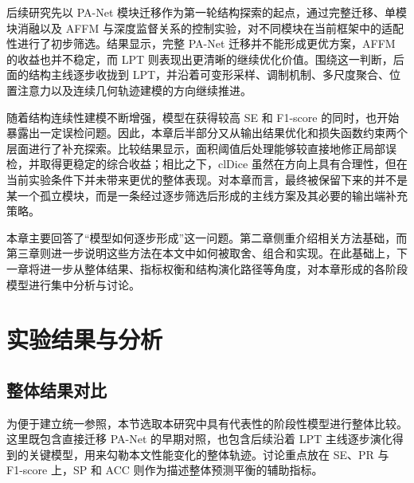\documentclass[a4paper,12pt]{article}
\begin{document}
后续研究先以 PA-Net 模块迁移作为第一轮结构探索的起点，通过完整迁移、单模块消融以及 AFFM 与深度监督关系的控制实验，对不同模块在当前框架中的适配性进行了初步筛选。结果显示，完整 PA-Net 迁移并不能形成更优方案，AFFM 的收益也并不稳定，而 LPT 则表现出更清晰的继续优化价值。围绕这一判断，后面的结构主线逐步收拢到 LPT，并沿着可变形采样、调制机制、多尺度聚合、位置注意力以及连续几何轨迹建模的方向继续推进。

随着结构连续性建模不断增强，模型在获得较高 SE 和 F1-score 的同时，也开始暴露出一定误检问题。因此，本章后半部分又从输出结果优化和损失函数约束两个层面进行了补充探索。比较结果显示，面积阈值后处理能够较直接地修正局部误检，并取得更稳定的综合收益；相比之下，clDice 虽然在方向上具有合理性，但在当前实验条件下并未带来更优的整体表现。对本章而言，最终被保留下来的并不是某一个孤立模块，而是一条经过逐步筛选后形成的主线方案及其必要的输出端补充策略。

本章主要回答了“模型如何逐步形成”这一问题。第二章侧重介绍相关方法基础，而第三章则进一步说明这些方法在本文中如何被取舍、组合和实现。在此基础上，下一章将进一步从整体结果、指标权衡和结构演化路径等角度，对本章形成的各阶段模型进行集中分析与讨论。

\section{实验结果与分析}

\subsection{整体结果对比}
为便于建立统一参照，本节选取本研究中具有代表性的阶段性模型进行整体比较。这里既包含直接迁移 PA-Net 的早期对照，也包含后续沿着 LPT 主线逐步演化得到的关键模型，用来勾勒本文性能变化的整体轨迹。讨论重点放在 SE、PR 与 F1-score 上，SP 和 ACC 则作为描述整体预测平衡的辅助指标。

\begin{table}[htbp]
\centering
\caption{第四章代表性模型整体结果对比}
\label{tab:chapter4_overall_cn}
\end{table}
\end{document}
